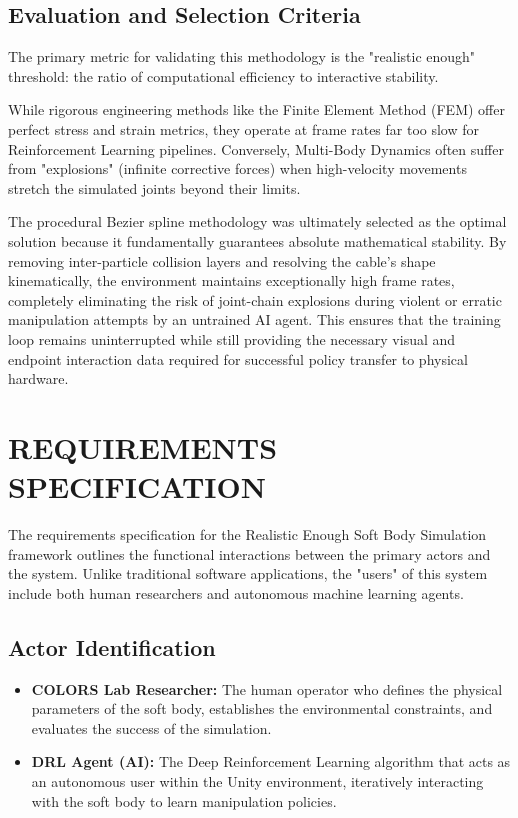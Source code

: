 \documentclass[a4paper,12pt]{report}
\begin{document}
\section{Evaluation and Selection Criteria}
The primary metric for validating this methodology is the "realistic enough" threshold: the ratio of computational efficiency to interactive stability. 

While rigorous engineering methods like the Finite Element Method (FEM) offer perfect stress and strain metrics, they operate at frame rates far too slow for Reinforcement Learning pipelines. Conversely, Multi-Body Dynamics often suffer from "explosions" (infinite corrective forces) when high-velocity movements stretch the simulated joints beyond their limits. 

The procedural Bezier spline methodology was ultimately selected as the optimal solution because it fundamentally guarantees absolute mathematical stability. By removing inter-particle collision layers and resolving the cable's shape kinematically, the environment maintains exceptionally high frame rates, completely eliminating the risk of joint-chain explosions during violent or erratic manipulation attempts by an untrained AI agent. This ensures that the training loop remains uninterrupted while still providing the necessary visual and endpoint interaction data required for successful policy transfer to physical hardware.

\chapter{REQUIREMENTS SPECIFICATION}
The requirements specification for the Realistic Enough Soft Body Simulation framework outlines the functional interactions between the primary actors and the system. Unlike traditional software applications, the "users" of this system include both human researchers and autonomous machine learning agents.

\section{Actor Identification}
\begin{itemize}
    \item \textbf{COLORS Lab Researcher:} The human operator who defines the physical parameters of the soft body, establishes the environmental constraints, and evaluates the success of the simulation.
    \item \textbf{DRL Agent (AI):} The Deep Reinforcement Learning algorithm that acts as an autonomous user within the Unity environment, iteratively interacting with the soft body to learn manipulation policies.
\end{itemize}
\end{document}
